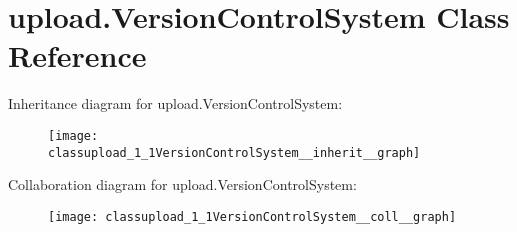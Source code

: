 \hypertarget{classupload_1_1VersionControlSystem}{}\section{upload.\+Version\+Control\+System Class Reference}
\label{classupload_1_1VersionControlSystem}


Inheritance diagram for upload.\+Version\+Control\+System\+:\nopagebreak
\begin{figure}[H]
\begin{center}
\leavevmode
\texttt{[image: classupload\_1\_1VersionControlSystem\_\_inherit\_\_graph]}
\end{center}
\end{figure}


Collaboration diagram for upload.\+Version\+Control\+System\+:\nopagebreak
\begin{figure}[H]
\begin{center}
\leavevmode
\texttt{[image: classupload\_1\_1VersionControlSystem\_\_coll\_\_graph]}
\end{center}
\end{figure}
